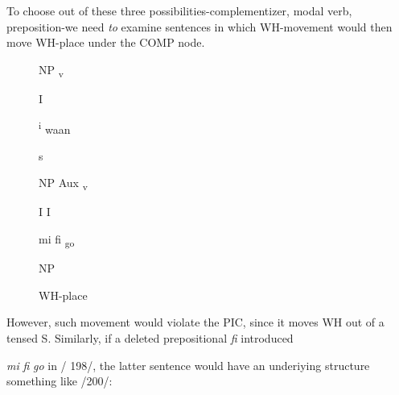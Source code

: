 To choose out of these three possibilities-complementizer, modal verb, preposition-we need \textit{to }examine sentences in which
WH-movement would then move WH-place under the COMP node.

\begin{figure}
NP \textsubscript{v}

I 

\textsuperscript{i} waan

s

NP Aux \textsubscript{v}

I I 

mi fi \textsubscript{go}

NP

WH-place
\end{figure}



However, such movement would violate the PIC, since it moves WH out of a tensed S. Similarly, if a deleted prepositional \textit{fi} introduced

\ea\label{ex:2:201}
 \z

\textit{mi} \textit{fi} \textit{go} in / 198/, the latter sentence would have an underiying structure something like /200/:

